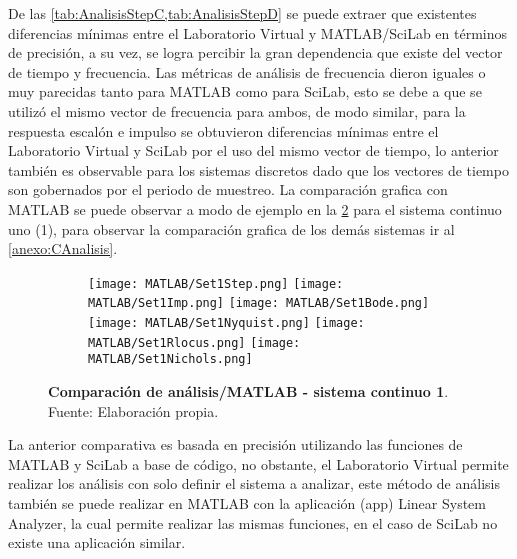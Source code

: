         De las \cref{tab:AnalisisStepC,tab:AnalisisStepD} se puede extraer que existentes diferencias mínimas  entre el Laboratorio Virtual y MATLAB/SciLab en términos de precisión, a su vez, se logra percibir la gran dependencia que existe del vector de tiempo y frecuencia. Las métricas de análisis de frecuencia dieron iguales o muy parecidas tanto para MATLAB como para SciLab, esto se debe a que se utilizó el mismo vector de frecuencia para ambos, de modo similar, para la respuesta escalón e impulso se obtuvieron diferencias mínimas entre el Laboratorio Virtual y SciLab por el uso del mismo vector de tiempo, lo anterior también es observable para los sistemas discretos dado que los vectores de tiempo son gobernados por el periodo de muestreo. La comparación grafica con MATLAB se puede observar a modo de ejemplo en la \cref{fig:Set1} para el sistema continuo uno (1), para observar la comparación grafica de los demás sistemas ir al \ref{anexo:CAnalisis}.
        
        \pagebreak

        \begin{figure}[htb]
            \centering
            \begin{subfigure}[t]{0.99\textwidth}
                \centering
                \texttt{[image: MATLAB/Set1Step.png]}
                \texttt{[image: MATLAB/Set1Imp.png]}
                \texttt{[image: MATLAB/Set1Bode.png]}
                \texttt{[image: MATLAB/Set1Nyquist.png]}
                \texttt{[image: MATLAB/Set1Rlocus.png]}
                \texttt{[image: MATLAB/Set1Nichols.png]}
                \label{fig:Set1sub}
            \end{subfigure}
            \caption[Comparación de análisis/MATLAB - sistema continuo 1]{\textbf{Comparación de análisis/MATLAB - sistema continuo 1}. Fuente: Elaboración propia. \label{fig:Set1}}
        \end{figure}

        \clearpage

        La anterior comparativa es basada en precisión utilizando las funciones de MATLAB y SciLab a base de código, no obstante, el Laboratorio Virtual permite realizar los análisis con solo definir el sistema a analizar, este método de análisis también se puede realizar en MATLAB con la aplicación (app) Linear System Analyzer, la cual permite realizar las mismas funciones, en el caso de SciLab no existe una aplicación similar.

